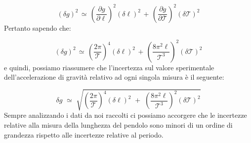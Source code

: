 \begin{equation*}
(\delta g)^2 \, \simeq \, \left( \frac{\partial g}{\partial \ell} \right)^2 (\delta \ell)^2 \, + \, \left( \frac{\partial g}{\partial \mathcal{T}} \right)^2 (\delta \mathcal{T})^2
\end{equation*}
%
Pertanto sapendo che:

\begin{equation*}
(\delta g)^2 \, \simeq \, \left( \frac{2 \pi}{\mathcal{T}} \right)^4 (\delta \ell)^2 \, + \, \left( \frac{8 \pi^2 \ell}{\mathcal{T}^3} \right)^2 (\delta \mathcal{T})^2
\end{equation*}
%
e quindi, possiamo riassumere che l'incertezza sul valore sperimentale dell'accelerazione di gravità relativo ad ogni singola misura è il seguente:

\begin{equation} \label{eq:delta_g}
\delta g \,\, \simeq \,\, \sqrt{\left( \frac{2 \pi}{\mathcal{T}} \right)^4 (\delta \ell)^2 \,\, + \,\, \left( \frac{8 \pi^2 \ell}{\mathcal{T}^3} \right)^2 (\delta \mathcal{T})^2}
\end{equation}
%
Sempre analizzando i dati da noi raccolti ci possiamo accorgere che le incertezze relative alla misura della lunghezza del pendolo sono minori di un ordine di grandezza rispetto alle incertezze relative al periodo.


